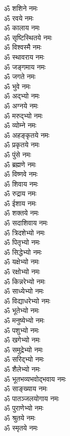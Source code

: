\begin{multicols}{2}
\begin{flushleft}
ॐ शशिने नमः\\
ॐ रवये नमः\\
ॐ कालाय नमः\hfill{}\\
ॐ सृष्टिस्थितये नमः\\
ॐ विश्वस्मै नमः\\
ॐ स्थावराय नमः\\
ॐ जङ्गमाय नमः\\
ॐ जगते नमः\\
ॐ भुवे नमः\\
ॐ अद्भ्यो नमः\\
ॐ अग्नये नमः\\
ॐ मरुद्भ्यो नमः\\
ॐ व्योम्ने नमः\hfill{}\\
ॐ अहङ्कृतये नमः\\
ॐ प्रकृतये नमः\\
ॐ पुंसे नमः\\
ॐ ब्रह्मणे नमः\\
ॐ विष्णवे नमः\\
ॐ शिवाय नमः\\
ॐ रुद्राय नमः\\
ॐ ईशाय नमः\\
ॐ शक्तये नमः\\
ॐ सदाशिवाय नमः\hfill{}\\
ॐ त्रिदशेभ्यो नमः\\
ॐ पितृभ्यो नमः\\
ॐ सिद्धेभ्यो नमः\\
ॐ यक्षेभ्यो नमः\\
ॐ रक्षोभ्यो नमः\\
ॐ किन्नरेभ्यो नमः\\
ॐ साध्येभ्यो नमः\\
ॐ विद्याधरेभ्यो नमः\\
ॐ भूतेभ्यो नमः\\
ॐ मनुष्येभ्यो नमः\hfill{}\\
ॐ पशुभ्यो नमः\\
ॐ खगेभ्यो नमः\\
ॐ समुद्रेभ्यो नमः\\
ॐ सरिद्भ्यो नमः\\
ॐ शैलेभ्यो नमः\\
ॐ भूतभव्यभवोद्भवाय नमः\\
ॐ साङ्ख्याय नमः\\
ॐ पातञ्जलयोगाय नमः\\
ॐ पुराणेभ्यो नमः\\
ॐ श्रुतये नमः\hfill{}\\
ॐ स्मृतये नमः\\

\end{flushleft}
\end{multicols}
